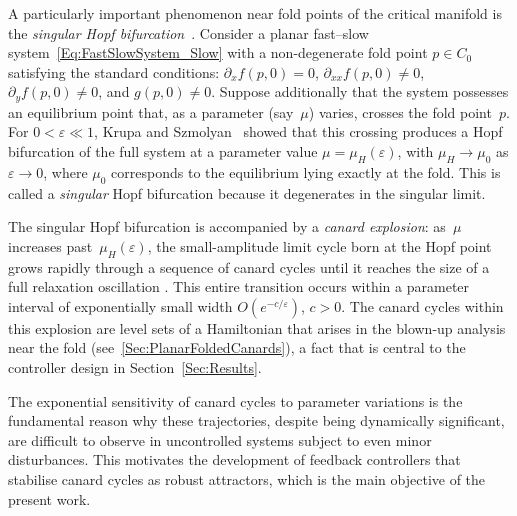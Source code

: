 \documentclass[3p]{elsarticle}
\theoremstyle{plain}
\theoremstyle{remark}
\theoremstyle{definition}
\begin{document}
A particularly important phenomenon near fold points of the critical manifold is the \emph{singular Hopf bifurcation}~\cite{Ref:Krupa2001,Ref:Kuehn2015}. Consider a planar fast--slow system~\eqref{Eq:FastSlowSystem_Slow} with a non-degenerate fold point $p \in C_0$ satisfying the standard conditions: $\partial_x f(p,0) = 0$, $\partial_{xx} f(p,0) \neq 0$, $\partial_y f(p,0) \neq 0$, and $g(p,0) \neq 0$. Suppose additionally that the system possesses an equilibrium point that, as a parameter (say~$\mu$) varies, crosses the fold point~$p$. For $0 < \varepsilon \ll 1$, Krupa and Szmolyan~\cite{Ref:Krupa2001} showed that this crossing produces a Hopf bifurcation of the full system at a parameter value $\mu = \mu_H(\varepsilon)$, with $\mu_H \to \mu_0$ as $\varepsilon \to 0$, where $\mu_0$ corresponds to the equilibrium lying exactly at the fold. This is called a \emph{singular} Hopf bifurcation because it degenerates in the singular limit.
 
The singular Hopf bifurcation is accompanied by a \emph{canard explosion}: as~$\mu$ increases past~$\mu_H(\varepsilon)$, the small-amplitude limit cycle born at the Hopf point grows rapidly through a sequence of canard cycles until it reaches the size of a full relaxation oscillation \cite{Ref:Kuehn2015}. This entire transition occurs within a parameter interval of exponentially small width $O(e^{-c/\varepsilon})$, $c > 0$. The canard cycles within this explosion are level sets of a Hamiltonian that arises in the blown-up analysis near the fold (see~\ref{Sec:PlanarFoldedCanards}), a fact that is central to the controller design in Section~\ref{Sec:Results}.



The exponential sensitivity of canard cycles to parameter variations is the fundamental reason why these trajectories, despite being dynamically significant, are difficult to observe in uncontrolled systems subject to even minor disturbances. This motivates the development of feedback controllers that stabilise canard cycles as robust attractors, which is the main objective of the present work.
\end{document}

